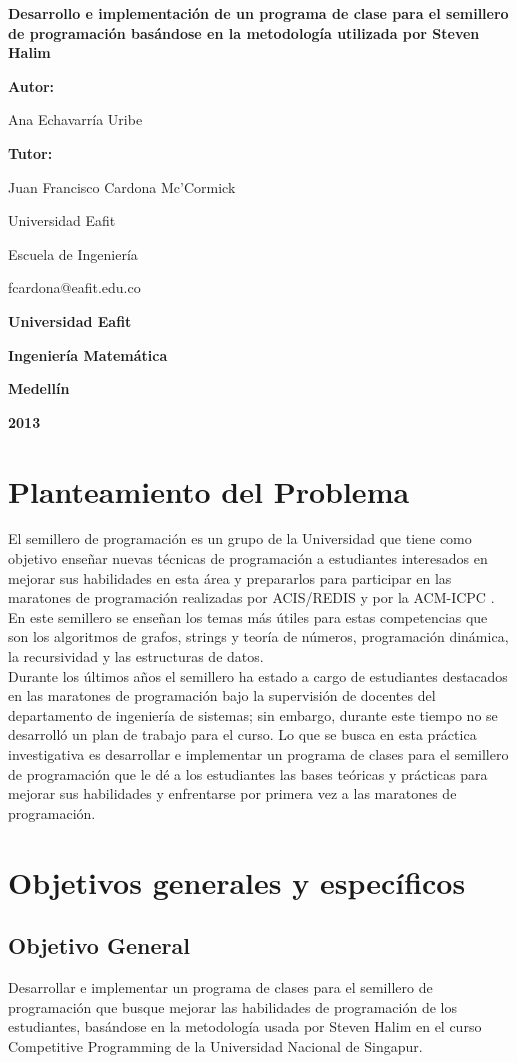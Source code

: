 \documentclass[11pt, oneside]{article}
\makeatletter
\theoremstyle{definition}
\theoremstyle{remark}
\newcommand\portada{
\begin{titlepage}
		\begin{center}
			{\large \bf Desarrollo e implementación de un programa de clase para el semillero de programación basándose en la metodología utilizada por Steven Halim}
			\vfill
			{\large\bf Autor: \par}
			{\large Ana Echavarría Uribe\par}
			{\large\bf Tutor: \par}
			{\large Juan Francisco Cardona Mc'Cormick \par Universidad Eafit \par Escuela de Ingeniería \par fcardona@eafit.edu.co }
			\vfill
			{\large\bf Universidad Eafit  \par}
			{\large\bf Ingeniería Matemática \par}
			{\large\bf Medellín\par}
			{\large\bf 2013 \par}
		\end{center}
\end{titlepage}
}
\makeatother
\begin{document}
\portada


\renewcommand\contentsname{\centering Tabla de Contenidos}
\tableofcontents
\clearpage

\section{Planteamiento del Problema}
El semillero de programación es un grupo de la Universidad que tiene como objetivo enseñar nuevas técnicas de programación a estudiantes interesados en mejorar sus habilidades en esta área y prepararlos para participar en las maratones de programación realizadas por ACIS/REDIS \cite{ACIS} y por la ACM-ICPC \cite{ICPC}. En este semillero se enseñan los temas más útiles \cite{ProgrammingChallenges, Halim, Halim2, Brasil} para estas competencias que son los algoritmos de grafos, strings y teoría de números, programación dinámica, la recursividad y las estructuras de datos.\\
Durante los últimos años el semillero ha estado a cargo de estudiantes destacados en las maratones de programación bajo la supervisión de docentes del departamento de ingeniería de sistemas; sin embargo, durante este tiempo no se desarrolló un plan de trabajo para el curso. Lo que se busca en esta práctica investigativa es desarrollar e implementar un programa de clases para el semillero de programación que le dé a los estudiantes las bases teóricas y prácticas para mejorar sus habilidades y enfrentarse por primera vez a las maratones de programación.

\section{Objetivos generales y específicos}

\subsection{Objetivo General}
Desarrollar e implementar un programa de clases para el semillero de programación que busque mejorar las habilidades de programación de los estudiantes, basándose en la metodología usada por Steven Halim en el curso Competitive Programming de la Universidad Nacional de Singapur.
\end{document}
